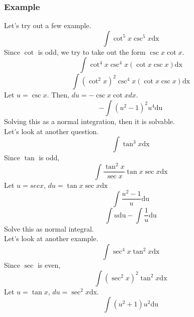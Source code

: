 \documentclass{article}
\begin{document}
\subsubsection{Example}
Let's try out a few example.
\begin{equation*}
  \int \cot^5 x \csc^5 x \text{dx}
\end{equation*}
Since $\cot$ is odd, we try to take out the form $\csc x \cot x$.
\begin{equation*}
  \int \cot^4 x \csc^4 x (\cot x\csc x) \text{dx}
\end{equation*}
\begin{equation*}
  \int (\cot^2 x)^2 \csc^4 x (\cot x\csc x) \text{dx}
\end{equation*}
Let $u = \csc x$. Then, $du = -\csc x \cot x dx$.
\begin{equation*}
  -\int (u^2-1)^2 u^4 \text{du}
\end{equation*}
Solving this as a normal integration, then it is solvable.\\
Let's look at another question.
\begin{equation*}
  \int \tan^3 x \text{dx}
\end{equation*}
Since $\tan$ is odd,
\begin{equation*}
  \int \frac{\tan^2 x}{\sec x} \tan x\sec x \text{dx}
\end{equation*}
Let $u = secx$, $du = \tan x\sec x \text{dx}$
\begin{equation*}
  \int \frac{u^2 -1} {u} \text{du}
\end{equation*}
\begin{equation*}
  \int u \text{du} - \int \frac{1}{u} \text{du}
\end{equation*}
Solve this as normal integral.
\\Let's look at another example.
\begin{equation*}
  \int \sec^4 x \tan^2 x \text{dx}
\end{equation*}
Since $\sec$ is even, 
\begin{equation*}
  \int (\sec^2 x)^2 \tan^2 x \text{dx}
\end{equation*}
Let $u = \tan x$, $du = \sec^2 x \text{dx}$.
\begin{equation*}
  \int (u^2+1)u^2 \text{du}
\end{equation*}
\end{document}
